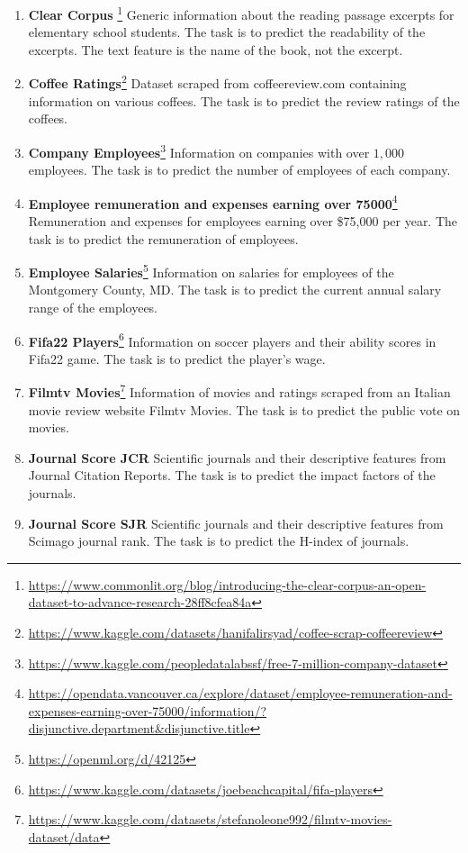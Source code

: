 \documentclass{article}
\theoremstyle{plain}
\theoremstyle{definition}
\theoremstyle{remark}
\begin{document}
\begin{enumerate}
    \item \textbf{Clear Corpus} \citep{crossleyLarge2023}\footnote{\url{https://www.commonlit.org/blog/introducing-the-clear-corpus-an-open-dataset-to-advance-research-28ff8cfea84a}} Generic information about the reading passage excerpts for elementary school students. The task is to predict the readability of the excerpts. The text feature is the name of the book, not the excerpt.
    \item \textbf{Coffee Ratings}\footnote{\url{https://www.kaggle.com/datasets/hanifalirsyad/coffee-scrap-coffeereview}} Dataset scraped from coffeereview.com containing information on various coffees. The task is to predict the review ratings of the coffees.
    \item \textbf{Company Employees}\footnote{\url{https://www.kaggle.com/peopledatalabssf/free-7-million-company-dataset}} Information on companies with over $1,000$ employees. The task is to predict the number of employees of each company.
    \item \textbf{Employee remuneration and expenses earning over 75000}\footnote{\url{https://opendata.vancouver.ca/explore/dataset/employee-remuneration-and-expenses-earning-over-75000/information/?disjunctive.department&disjunctive.title}} Remuneration and expenses for employees earning over \$75,000 per year. The task is to predict the remuneration of employees.
    \item \textbf{Employee Salaries}\footnote{\url{https://openml.org/d/42125}} Information on salaries for employees of the Montgomery County, MD. The task is to predict the current annual salary range of the employees.
    \item \textbf{Fifa22 Players}\footnote{\url{https://www.kaggle.com/datasets/joebeachcapital/fifa-players}} Information on soccer players and their ability scores in Fifa22 game. The task is to predict the player's wage.
    \item \textbf{Filmtv Movies}\footnote{\url{https://www.kaggle.com/datasets/stefanoleone992/filmtv-movies-dataset/data}} Information of movies and ratings scraped from an Italian movie review website Filmtv Movies. The task is to predict the public vote on movies.
    \item  \textbf{Journal Score JCR} Scientific journals and their descriptive features from Journal Citation Reports. The task is to predict the impact factors of the journals.
    \item  \textbf{Journal Score SJR} Scientific journals and their descriptive features from Scimago journal rank. The task is to predict the H-index of journals.

\end{enumerate}
\end{document}
